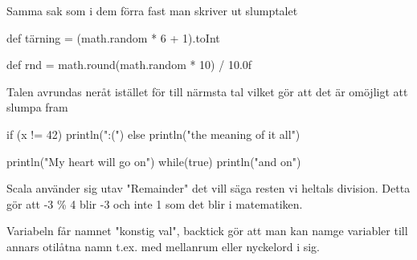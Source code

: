 {{\Subtask  Samma sak som i dem förra fast man skriver ut slumptalet

\Task %

\Subtask {}

\Subtask{}

\Subtask {}

\Subtask{}

\Subtask {}

\Subtask {}

\Subtask {}




\ExtraTasks %

\Task %

\Subtask 
\begin{REPLnonum}
def tärning = (math.random * 6 + 1).toInt
\end{REPLnonum}

\Subtask
\begin{REPLnonum}
def rnd = math.round(math.random * 10) / 10.0f
\end{REPLnonum}

\Subtask
Talen avrundas neråt istället för till närmsta tal vilket gör att det är omöjligt att slumpa fram 

\Task %

\Task %

\begin{Code}
if (x != 42)  println(":(") else println("the meaning of it all")
\end{Code}

\Task %

\Task %

\begin{Code}
println("My heart will go on")
while(true)  println("and on")
\end{Code}

\Task %

\AdvancedTasks %

\Task %
Scala använder sig utav "Remainder" det vill säga resten vi heltals division. Detta gör att -3 \% 4 blir -3 och inte 1 som det blir i matematiken.

\Task %

\Subtask
Variabeln får namnet "konstig val", backtick gör att man kan namge variabler till annars otilåtna namn t.ex. med mellanrum eller nyckelord i sig.
 
}}
